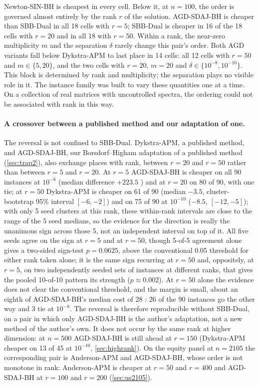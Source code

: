 Newton-SIN-BH is cheapest in every cell. Below it, at $n=100$, the order is
governed almost entirely by the rank $r$ of the solution. AGD-SDAJ-BH is
cheaper than SBB-Dual in all 18 cells with $r=5$; SBB-Dual is cheaper in 16 of
the 18 cells with $r=20$ and in all 18 with $r=50$. Within a rank, the
near-zero multiplicity $m$ and the separation $\delta$ rarely change
this pair's order. Both AGD variants fall below Dykstra-APM to last place in
14 cells: all 12 cells with $r=50$ and $m\in\{5,20\}$, and the two cells with
$r=20$, $m=20$ and $\delta\in\{10^{-8},10^{-10}\}$. This block is determined
by rank and multiplicity; the separation plays no visible role in it. The
instance family was built to vary these quantities one at a time. On a
collection of real matrices with uncontrolled spectra, the ordering could not
be associated with rank in this way.

\paragraph{A crossover between a published method and our adaptation of one.}
The reversal is not confined to SBB-Dual. Dykstra-APM, a published method,
and AGD-SDAJ-BH, our Borsdorf--Higham adaptation of a published method
(\cref{sec:trap2}), also exchange places with rank, between $r=20$ and
$r=50$ rather than between $r=5$ and $r=20$. At $r=5$
AGD-SDAJ-BH is cheaper on all 90 instances at $10^{-8}$ (median difference
$+223.5$ \EVDs) and at $r=20$ on 80 of 90, with one tie; at $r=50$ Dykstra-APM
is cheaper on 61 of 90 (median $-3.5$, cluster-bootstrap 95\% interval
$[-6,-2]$) and on 75 of 90 at $10^{-10}$ ($-8.5$, $[-12,-5]$); with only 5
seed clusters at this rank, these within-rank intervals are close to the
range of the 5 seed medians, so the evidence for the direction is really
the unanimous sign across those 5, not an independent interval on top of
it. All five seeds
agree on the sign at $r=5$ and at $r=50$, though 5-of-5 agreement alone
gives a two-sided sign-test $p=0.0625$, above the conventional 0.05
threshold for either rank taken alone; it is the same sign recurring at
$r=50$ and, oppositely, at $r=5$, on two independently seeded sets of
instances at different ranks, that gives the pooled 10-of-10 pattern its
strength ($p\approx0.002$). At $r=50$ alone the evidence does not clear the
conventional threshold, and the margin is small, about an eighth of
AGD-SDAJ-BH's median cost of 28 \EVDs: 26 of the 90 instances go the other
way and 3 tie at $10^{-8}$. The reversal is therefore
reproducible without SBB-Dual, on a pair in which only AGD-SDAJ-BH is the
author's adaptation, not a new method of the author's own. It does not occur by the
same rank at higher dimension: at $n=500$
AGD-SDAJ-BH is still ahead at $r=150$ (Dykstra-APM cheaper on 13 of 45 at
$10^{-10}$, \cref{sec:highrank}). On the equity panel at $n=2105$ the
corresponding pair is Anderson-APM and AGD-SDAJ-BH, whose order is not
monotone in rank: Anderson-APM is cheaper at $r=50$ and $r=400$ and
AGD-SDAJ-BH at $r=100$ and $r=200$ (\cref{sec:us2105}).

